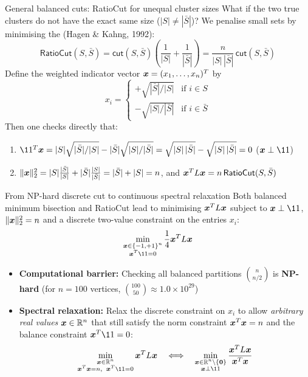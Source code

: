 \documentclass[aspectratio=169]{beamer}\usepackage[]{graphicx}\usepackage[]{xcolor}
\begin{document}
\begin{frame}{General balanced cuts: RatioCut for unequal cluster sizes}
What if the two true clusters do not have the exact same size ($|S| \neq |\bar{S}|$)? We penalise small sets by minimising the  (Hagen \& Kahng, 1992):
\[
\mathsf{RatioCut}(S, \bar{S}) = \mathsf{cut}(S, \bar{S})\left(\frac{1}{|S|} + \frac{1}{|\bar{S}|}\right) = \frac{n}{|S|\,|\bar{S}|}\,\mathsf{cut}(S, \bar{S})
\]
\vfill
Define the weighted indicator vector $\bm{x} = (x_1, \ldots, x_n)^T$ by
\[
x_i = \begin{cases}
+\sqrt{|\bar{S}| / |S|} & \text{if } i \in S \\[2pt]
-\sqrt{|S| / |\bar{S}|} & \text{if } i \in \bar{S}
\end{cases}
\]
Then one checks directly that:
\begin{enumerate}
\item $\11^T \bx = |S|\sqrt{|\bar{S}|/|S|} - |\bar{S}|\sqrt{|S|/|\bar{S}|} = \sqrt{|S|\,|\bar{S}|} - \sqrt{|S|\,|\bar{S}|} = 0$ ($\bx \perp \11$)
\item $\|\bm{x}\|_2^2 = |S|\frac{|\bar{S}|}{|S|} + |\bar{S}|\frac{|S|}{|\bar{S}|} = |\bar{S}| + |S| = n$, and $\bm{x}^T L \bm{x} = n\,\mathsf{RatioCut}(S, \bar{S})$
\end{enumerate}
\end{frame}


\begin{frame}{From NP-hard discrete cut to continuous spectral relaxation}
Both balanced minimum bisection and RatioCut lead to minimising $\bm{x}^T L \bm{x}$ subject to $\bx \perp \11$, $\|\bm{x}\|_2^2 = n$ and a discrete two-value constraint on the entries $x_i$:
\[
\min_{\substack{\bx \in \{-1, +1\}^n \\ \bx^T \11 = 0}} \frac{1}{4}\bx^T L \bx
\]
\vfill
\begin{itemize}
\item \textbf{Computational barrier:} Checking all balanced partitions $\binom{n}{n/2}$ is \textbf{NP-hard} (for $n = 100$ vertices, $\binom{100}{50} \approx 1.0 \times 10^{29}$)
\vfill
\item \textbf{Spectral relaxation:} Relax the discrete constraint on $x_i$ to allow \emph{arbitrary real values} $\bm{x} \in \mathbb{R}^n$ that still satisfy the norm constraint $\bm{x}^T \bm{x} = n$ and the balance constraint $\bx^T \11 = 0$:
\[
\min_{\substack{\bx \in \IR^n \\ \bx^T \bx = n, \;\; \bx^T \11 = 0}} \bx^T L \bx \quad \Longleftrightarrow \quad \min_{\substack{\bx \in \IR^n \setminus \{\b0\} \\ \bx \perp \11}} \frac{\bx^T L \bx}{\bx^T \bx}
\]
\end{itemize}
\end{frame}
\end{document}
